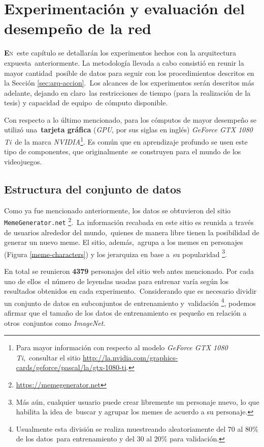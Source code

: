 \chapter{Experimentación y evaluación del desempeño de la red}

\noindent
\lettrine[lines=2, lhang=0.33, loversize=0.25]{\textbf{E}}{n}\
este capítulo se detallarán los experimentos hechos con la arquitectura expuesta\
anteriormente. La metodología llevada a cabo consistió en reunir la mayor cantidad\
posible de datos para seguir con los procedimientos descritos en la Sección \ref{sec:arq-accion}.\
Los alcances de los experimentos serán descritos más adelante, dejando en claro\
las restricciones de tiempo (para la realización de la tesis) y capacidad de equipo\
de cómputo disponible.\par
Con respecto a lo último mencionado, para los cómputos de mayor desempeño se utilizó una\
\textbf{tarjeta gráfica} (\emph{GPU}, por sus siglas en inglés) \emph{GeForce GTX 1080 Ti}\
de la marca \emph{NVIDIA}\footnote{
  Para mayor información con respecto al modelo \emph{GeForce GTX 1080 Ti},\
  consultar el sitio \url{http://la.nvidia.com/graphics-cards/geforce/pascal/la/gtx-1080-ti}.
}. Es común que en aprendizaje profundo se usen este tipo de componentes, que originalmente\
se construyen para el mundo de los videojuegos.

\section{Estructura del conjunto de datos} \label{sec:dataset}

\noindent
Como ya fue mencionado anteriormente, los datos se obtuvieron del sitio \verb+MemeGenerator.net+%
\footnote{\url{https://memegenerator.net}}.\
La información recabada en este sitio es reunida a través de usuarios alrededor del mundo,\
quienes de manera libre tienen la posibilidad de generar un nuevo meme. El sitio, además,\
agrupa a los memes en personajes (Figura \ref{meme-characters}) y los jerarquiza en base a\
su popularidad%
\footnote{
  Más aún, cualquier usuario puede crear libremente un personaje nuevo, lo que habilita la idea de\
  buscar y agrupar los memes de acuerdo a su personaje.
}.\par
En total se reunieron \textbf{4379} personajes del sitio web antes mencionado. Por cada uno de ellos\
el número de leyendas usadas para entrenar varía según los resultados obtenidos en cada experimento.\
Considerando que es necesario dividir un conjunto de datos en subconjuntos de entrenamiento y\
validación%
\footnote{
  Usualmente esta división se realiza muestreando aleatoriamente del $70$ al $80\%$ de los datos\
  para entrenamiento y del $30$ al $20\%$ para validación.
}, podemos afirmar que el tamaño de los datos de entrenamiento es pequeño en relación a otros\
conjuntos como \emph{ImageNet}.

